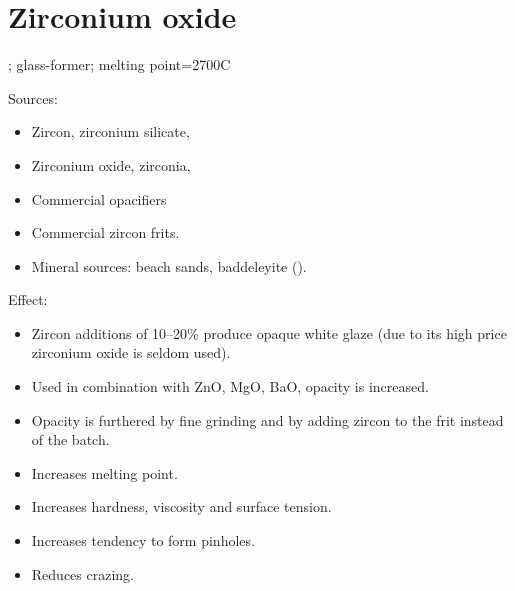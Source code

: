 \section{Zirconium oxide}
; glass-former; melting point=2700\degree C

Sources:
\begin{itemize}
  \item Zircon, zirconium silicate, 
  \item Zirconium oxide, zirconia, 
  \item Commercial opacifiers
  \item Commercial zircon frits.
  \item Mineral sources: beach sands, baddeleyite ().
\end{itemize}
Effect:
\begin{itemize}
  \item Zircon additions of 10--20\% produce opaque white glaze (due to its 
  high price zirconium oxide is seldom used).
  \item Used in combination with ZnO, MgO, BaO,  opacity is increased.
  \item Opacity is furthered by fine grinding and by adding zircon to the frit 
  instead of the batch.
  \item Increases melting point.
  \item Increases hardness, viscosity and surface tension.
  \item Increases tendency to form pinholes.
  \item Reduces crazing.
\end{itemize}
